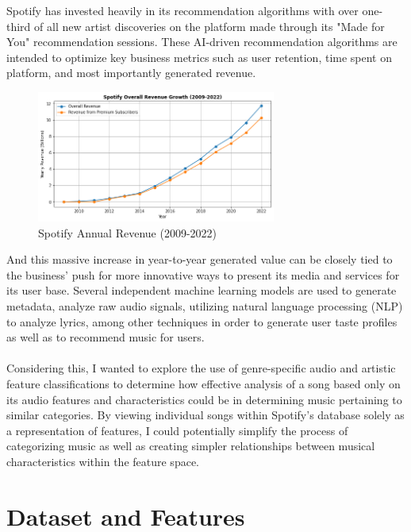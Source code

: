 \documentclass[12pt]{article}
\begin{document}
\noindent
Spotify has invested heavily in its recommendation algorithms with over one-third of all new artist discoveries on the platform made through its "Made for You" recommendation sessions. These AI-driven recommendation algorithms are intended to optimize key business metrics such as user retention, time spent on platform, and most importantly generated revenue.

\begin{figure}[htbp]
  \centering
  \vspace{-0.075cm}
  \includegraphics[width=0.7\textwidth]{revenue_growth.png}
  \caption{Spotify Annual Revenue (2009-2022)}
  \label{Spotify Annual Revenue (2009-2022}
\end{figure}

\noindent
And this massive increase in year-to-year generated value can be closely tied to the business' push for more innovative ways to present its media and services for its user base. Several independent machine learning models are used to generate metadata, analyze raw audio signals, utilizing natural language processing (NLP) to analyze lyrics, among other techniques in order to generate user taste profiles as well as to recommend music for users. 
\\ \\
Considering this, I wanted to explore the use of genre-specific audio and artistic feature classifications to determine how effective analysis of a song based only on its audio features and characteristics could be in determining music pertaining to similar categories. By viewing individual songs within Spotify's database solely as a representation of features, I could potentially simplify the process of categorizing music as well as creating simpler relationships between musical characteristics within the feature space.

\section{\textbf{Dataset and Features}}
\end{document}
